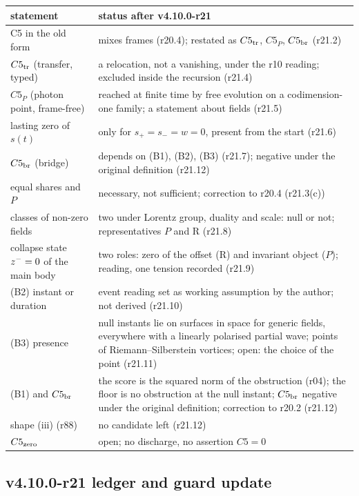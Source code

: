 \begin{center}
\small
\begin{tabular}{@{}>{\raggedright\arraybackslash}p{}>{\raggedright\arraybackslash}p{}@{}}
\toprule
statement & status after v4.10.0-r21\\
\midrule
C5 in the old form & mixes frames (r20.4); restated as \(C5_{\rm tr}\), \(C5_P\), \(C5_{\rm br}\) (r21.2)\\
\(C5_{\rm tr}\) (transfer, typed) & a relocation, not a vanishing, under the r10 reading; excluded inside the recursion (r21.4)\\
\(C5_P\) (photon point, frame-free) & reached at finite time by free evolution on a codimension-one family; a statement about fields (r21.5)\\
lasting zero of \(s(t)\) & only for \(s_+=s_-=w=0\), present from the start (r21.6)\\
\(C5_{\rm br}\) (bridge) & depends on (B1), (B2), (B3) (r21.7); negative under the original definition (r21.12)\\
equal shares and \(P\) & necessary, not sufficient; correction to r20.4 (r21.3(c))\\
classes of non-zero fields & two under Lorentz group, duality and scale: null or not; representatives \(P\) and R (r21.8)\\
collapse state \(z^-=0\) of the main body & two roles: zero of the offset (R) and invariant object (\(P\)); reading, one tension recorded (r21.9)\\
(B2) instant or duration & event reading set as working assumption by the author; not derived (r21.10)\\
(B3) presence & null instants lie on surfaces in space for generic fields, everywhere with a linearly polarised partial wave; points of Riemann--Silberstein vortices; open: the choice of the point (r21.11)\\
(B1) and \(C5_{\rm br}\) & the score is the squared norm of the obstruction (r04); the floor is no obstruction at the null instant; \(C5_{\rm br}\) negative under the original definition; correction to r20.2 (r21.12)\\
shape (iii) (r88) & no candidate left (r21.12)\\
\(C5_{\rm zero}\) & open; no discharge, no assertion \(C5=0\)\\
\bottomrule
\end{tabular}
\end{center}

\subsection*{v4.10.0-r21 ledger and guard update}
\label{subsec:v4100-r21-ledger-guard}

